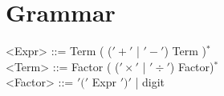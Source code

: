 \documentclass[10pt,letterpaper]{article}
\begin{document}
\section{Grammar}

<Expr> ::= Term ( ($'+'$ | $'-'$) Term )$^{*}$\\
<Term> ::= Factor ( ($'\times'$ | $'\div'$) Factor)$^{*}$\\
<Factor> ::= $'('$ Expr $')'$ | digit
\end{document}
